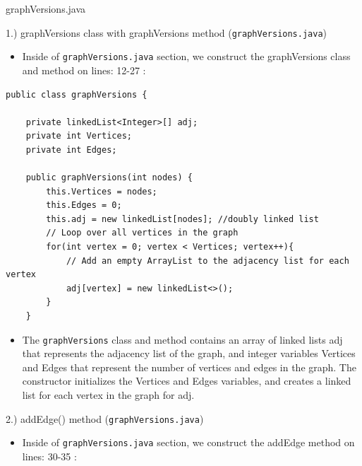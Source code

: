 \documentclass{article}
\begin{document}
\pagebreak


\begin{center}
\begin{large}
    graphVersions.java
\end{large}
\end{center}



\begin{large}
    1.) graphVersions class with graphVersions method (\verb|graphVersions.java|)
\end{large}

\begin{itemize}
\item Inside of \verb|graphVersions.java| section, we construct the graphVersions class and method on lines: 12-27 :
\end{itemize}

\begin{verbatim}
public class graphVersions {

    private linkedList<Integer>[] adj;
    private int Vertices;
    private int Edges;    

    public graphVersions(int nodes) {
        this.Vertices = nodes;
        this.Edges = 0;
        this.adj = new linkedList[nodes]; //doubly linked list
        // Loop over all vertices in the graph
        for(int vertex = 0; vertex < Vertices; vertex++){  
            // Add an empty ArrayList to the adjacency list for each vertex
            adj[vertex] = new linkedList<>();
        }
    }       
\end{verbatim}

\begin{itemize}

\item The \verb|graphVersions| class and method contains an array of linked lists adj that represents the adjacency list of the graph, and integer variables Vertices and Edges that represent the number of vertices and edges in the graph. The constructor initializes the Vertices and Edges variables, and creates a linked list for each vertex in the graph for adj.\\

\end{itemize}


\begin{large}
    2.) addEdge() method (\verb|graphVersions.java|)
\end{large}

\begin{itemize}

\item Inside of \verb|graphVersions.java| section, we construct the addEdge method on lines: 30-35 : 

\end{itemize}
\end{document}
